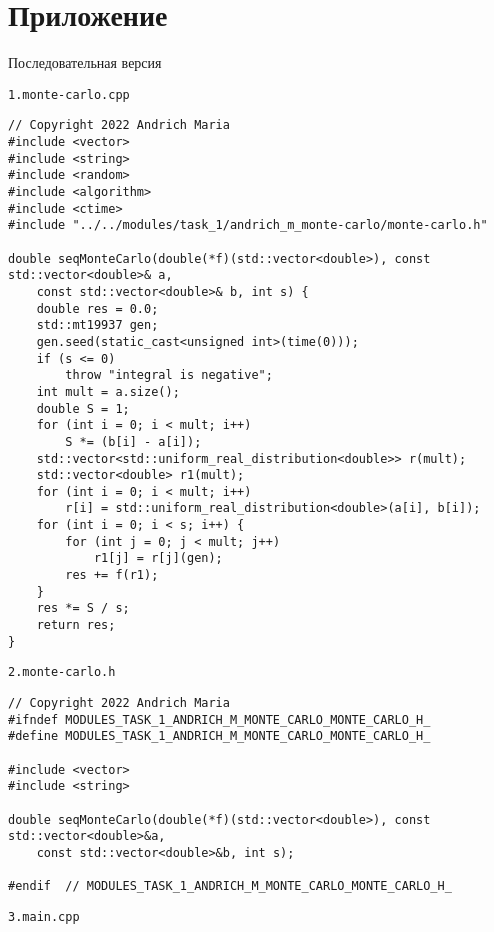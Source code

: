 \documentclass{report}
\begin{document}
\section*{Приложение}
\par Последовательная версия
\par \verb|1.monte-carlo.cpp|
\begin{lstlisting}
// Copyright 2022 Andrich Maria
#include <vector>
#include <string>
#include <random>
#include <algorithm>
#include <ctime>
#include "../../modules/task_1/andrich_m_monte-carlo/monte-carlo.h"

double seqMonteCarlo(double(*f)(std::vector<double>), const std::vector<double>& a,
    const std::vector<double>& b, int s) {
    double res = 0.0;
    std::mt19937 gen;
    gen.seed(static_cast<unsigned int>(time(0)));
    if (s <= 0)
        throw "integral is negative";
    int mult = a.size();
    double S = 1;
    for (int i = 0; i < mult; i++)
        S *= (b[i] - a[i]);
    std::vector<std::uniform_real_distribution<double>> r(mult);
    std::vector<double> r1(mult);
    for (int i = 0; i < mult; i++)
        r[i] = std::uniform_real_distribution<double>(a[i], b[i]);
    for (int i = 0; i < s; i++) {
        for (int j = 0; j < mult; j++)
            r1[j] = r[j](gen);
        res += f(r1);
    }
    res *= S / s;
    return res;
}
\end{lstlisting}
\par \verb|2.monte-carlo.h|
\begin{lstlisting}
// Copyright 2022 Andrich Maria
#ifndef MODULES_TASK_1_ANDRICH_M_MONTE_CARLO_MONTE_CARLO_H_
#define MODULES_TASK_1_ANDRICH_M_MONTE_CARLO_MONTE_CARLO_H_

#include <vector>
#include <string>

double seqMonteCarlo(double(*f)(std::vector<double>), const std::vector<double>&a,
    const std::vector<double>&b, int s);

#endif  // MODULES_TASK_1_ANDRICH_M_MONTE_CARLO_MONTE_CARLO_H_
\end{lstlisting}
\par \verb|3.main.cpp|
\end{document}
